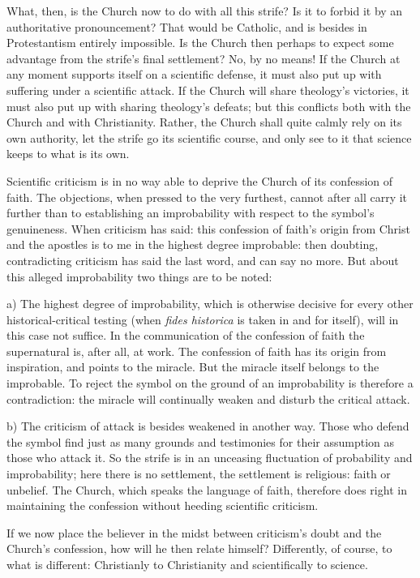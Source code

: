 \documentclass[12pt,a4paper]{book}
\begin{document}
What, then, is the Church now to do with all this strife? Is it to forbid it by
an authoritative pronouncement? That would be Catholic, and is besides in
Protestantism entirely impossible. Is the Church then perhaps to expect some
advantage from the strife's final settlement? No, by no means! If the Church at
any moment supports itself on a scientific defense, it must also put up with
suffering under a scientific attack. If the Church will share theology's
victories, it must also put up with sharing theology's defeats; but this
conflicts both with the Church and with Christianity. Rather, the Church shall
quite calmly rely on its own authority, let the strife go its scientific course,
and only see to it that science keeps to what is its own.

Scientific criticism is in no way able to deprive the Church of its confession
of faith. The objections, when pressed to the very furthest, cannot after all
carry it further than to establishing an improbability with respect to the
symbol's genuineness. When criticism has said: this confession of faith's
origin from Christ and the apostles is to me in the highest degree improbable:
then doubting, contradicting criticism has said the last word, and can say no
more. But about this alleged improbability two things are to be noted:

a) The highest degree of improbability, which is otherwise decisive for every
other historical-critical testing (when \textit{fides historica} is taken in and
for itself), will in this case not suffice. In the communication of the
confession of faith the supernatural is, after all, at work. The confession of
faith has its origin from inspiration, and points to the miracle. But the
miracle itself belongs to the improbable. To reject the symbol on the ground of
an improbability is therefore a contradiction: the miracle will continually
weaken and disturb the critical attack.

b) The criticism of attack is besides weakened in another way. Those who defend
the symbol find just as many grounds and testimonies for their assumption as
those who attack it. So the strife is in an unceasing fluctuation of probability
and improbability; here there is no settlement, the settlement is religious:
faith or unbelief. The Church, which speaks the language of faith, therefore
does right in maintaining the confession without heeding scientific criticism.

If we now place the believer in the midst between criticism's doubt and the
Church's confession, how will he then relate himself? Differently, of course, to
what is different: Christianly to Christianity and scientifically to science.
\end{document}
